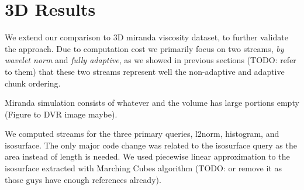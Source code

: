 \section{3D Results}

We extend our comparison to 3D miranda viscosity dataset, to further validate the approach.
Due to computation cost we primarily focus on two streams, {\em by wavelet norm} and {\em fully
adaptive}, as we showed in previous sections (TODO: refer to them) that these two streams represent
well the non-adaptive and adaptive chunk ordering.

Miranda simulation consists of whatever and the volume has large portions empty
(Figure to DVR image maybe).

We computed streams for the three primary queries, l2norm, histogram, and isosurface. The only
major code change was related to the isosurface query as the area instead of length is needed.
We used piecewise linear approximation to the isosurface extracted with Marching Cubes algorithm
(TODO: or remove it as those guys have enough references already).
